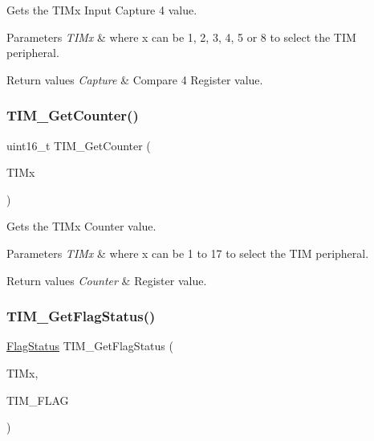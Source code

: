 Gets the T\+I\+Mx Input Capture 4 value. 


\begin{DoxyParams}{Parameters}
{\em T\+I\+Mx} & where x can be 1, 2, 3, 4, 5 or 8 to select the T\+IM peripheral. \\
\hline
\end{DoxyParams}

\begin{DoxyRetVals}{Return values}
{\em Capture} & Compare 4 Register value. \\
\hline
\end{DoxyRetVals}
\mbox{\label{group___t_i_m___private___functions_gab6826b144ae70e206f51ae8af5318a93}} 
\subsubsection{\texorpdfstring{TIM\_GetCounter()}{TIM\_GetCounter()}}
{\footnotesize\ttfamily uint16\+\_\+t T\+I\+M\+\_\+\+Get\+Counter (\begin{DoxyParamCaption}\item[{\mbox{\hyperlink{struct_t_i_m___type_def}{T\+I\+M\+\_\+\+Type\+Def}} $\ast$}]{T\+I\+Mx }\end{DoxyParamCaption})}



Gets the T\+I\+Mx Counter value. 


\begin{DoxyParams}{Parameters}
{\em T\+I\+Mx} & where x can be 1 to 17 to select the T\+IM peripheral. \\
\hline
\end{DoxyParams}

\begin{DoxyRetVals}{Return values}
{\em Counter} & Register value. \\
\hline
\end{DoxyRetVals}
\mbox{\label{group___t_i_m___private___functions_ga0adcbbd5e838ec8642e7a9b80075f41f}} 
\subsubsection{\texorpdfstring{TIM\_GetFlagStatus()}{TIM\_GetFlagStatus()}}
{\footnotesize\ttfamily \mbox{\hyperlink{group___exported__types_ga89136caac2e14c55151f527ac02daaff}{Flag\+Status}} T\+I\+M\+\_\+\+Get\+Flag\+Status (\begin{DoxyParamCaption}\item[{\mbox{\hyperlink{struct_t_i_m___type_def}{T\+I\+M\+\_\+\+Type\+Def}} $\ast$}]{T\+I\+Mx,  }\item[{uint16\+\_\+t}]{T\+I\+M\+\_\+\+F\+L\+AG }\end{DoxyParamCaption})}



